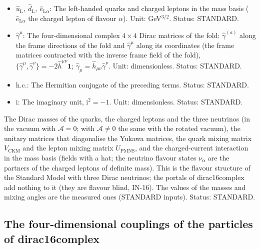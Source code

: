 \documentclass[
  10pt,
]{article}
\begin{document}
\begin{itemize}
  observable coordinates \(x_1, x_2, x_3, x_4\) of the fold (signature
  \(+,+,+,-\)); a repeated index is summed. Status: STANDARD.
\item
  \(\hat u_{\mathrm{L}},\ \hat d_{\mathrm{L}},\ \hat e_{\mathrm{L}\alpha}\):
  The left-handed quarks and charged leptons in the mass basis
  (\(\hat e_{\mathrm{L}\alpha}\) the charged lepton of flavour
  \(\alpha\)). Unit: GeV\(^{3/2}\). Status: STANDARD.
\item
  \(\hat\gamma^\mu\): The four-dimensional complex \(4 \times 4\) Dirac
  matrices of the fold: \(\hat\gamma^{(a)}\) along the frame directions
  of the fold and \(\hat\gamma^\mu\) along its coordinates (the frame
  matrices contracted with the inverse frame field of the fold),
  \(\{\hat\gamma^\mu, \hat\gamma^\nu\} = -2\hat h^{\mu\nu}\mathbf{1}\);
  \(\hat\gamma_\mu = \hat h_{\mu\nu}\hat\gamma^\nu\). Unit:
  dimensionless. Status: STANDARD.
\item
  \(\mathrm{h.c.}\): The Hermitian conjugate of the preceding terms.
  Status: STANDARD.
\item
  \(\mathrm{i}\): The imaginary unit, \(\mathrm{i}^2 = -1\). Unit:
  dimensionless. Status: STANDARD.
\end{itemize}

The Dirac masses of the quarks, the charged leptons and the three
neutrinos (in the vacuum with \(\mathcal{A} = 0\); with
\(\mathcal{A} \ne 0\) the same with the rotated vacuum), the unitary
matrices that diagonalise the Yukawa matrices, the quark mixing matrix
\(V_{\mathrm{CKM}}\) and the lepton mixing matrix \(U_{\mathrm{PMNS}}\),
and the charged-current interaction in the mass basis (fields with a
hat; the neutrino flavour states \(\nu_\alpha\) are the partners of the
charged leptons of definite mass). This is the flavour structure of the
Standard Model with three Dirac neutrinos; the portals of dirac16complex
add nothing to it (they are flavour blind, IN-16). The values of the
masses and mixing angles are the measured ones (STANDARD inputs).
Status: STANDARD.

\hypertarget{the-four-dimensional-couplings-of-the-particles-of-dirac16complex}{%
\subsection{The four-dimensional couplings of the particles of
dirac16complex}\label{the-four-dimensional-couplings-of-the-particles-of-dirac16complex}}
\end{document}
